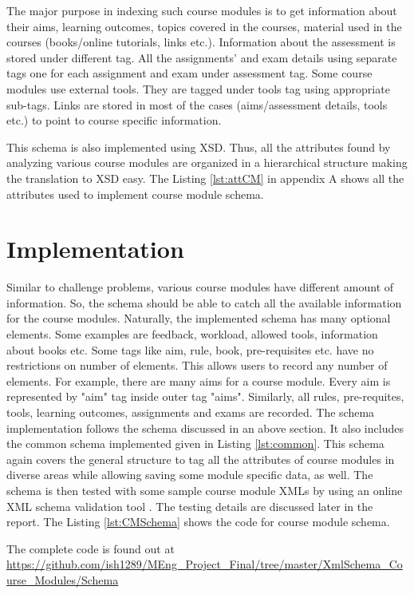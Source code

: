 \documentclass[11pt,letterpaper]{report}
\begin{document}
The major purpose in indexing such course modules is to get information about their aims, learning outcomes, topics covered in the courses, material used in the courses (books/online tutorials, links etc.). Information about the assessment is stored under different tag. All the assignments' and exam details using separate tags one for each assignment and exam under assessment tag. Some course modules use external tools. They are tagged under tools tag using appropriate sub-tags. Links are stored in most of the cases (aims/assessment details, tools etc.) to point to course specific information.     
 
This schema is also implemented using XSD. Thus, all the attributes found by analyzing various course modules are organized in a hierarchical structure making the translation to XSD easy. The Listing \ref{lst:attCM} in appendix A shows all the attributes used to implement course module schema.


\section{Implementation}
Similar to challenge problems, various course modules have different amount of information. So, the schema should be able to catch all the available information for the course modules. Naturally, the implemented schema has many optional elements. Some examples are feedback, workload, allowed tools, information about books etc. Some tags like aim, rule, book, pre-requisites etc. have no restrictions on number of elements. This allows users to record any number of elements. For example, there are many aims for a course module. Every aim is represented by "aim" tag inside outer tag "aims". Similarly, all rules, pre-requites, tools, learning outcomes, assignments and exams are recorded.    
The schema implementation follows the schema discussed in an above section. It also includes the common schema implemented given in Listing \ref{lst:common}. This schema again covers the general structure to tag all the attributes of course modules in diverse areas while allowing saving some module specific data, as well. The schema is then tested with some sample course module XMLs by using an online XML schema validation tool \cite{olXSD}. The testing details are discussed later in the report.  The Listing \ref{lst:CMSchema} shows the code for course module schema.
 
The complete code is found out at \url{https://github.com/ish1289/MEng_Project_Final/tree/master/XmlSchema_Course_Modules/Schema}
\end{document}
